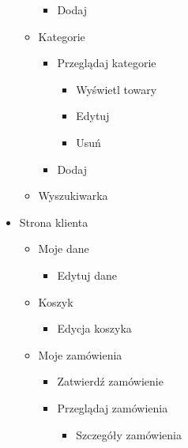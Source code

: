 \documentclass[10pt,a4paper]{article}
\begin{document}
\begin{itemize}
\begin{itemize}
\begin{itemize}
\begin{itemize}
		         \end{itemize}
		         \item Dodaj
		       \end{itemize}
		       \item Kategorie
		       \begin{itemize}
		         \item Przeglądaj kategorie
		         \begin{itemize}
		         \item Wyświetl towary
				 \item Edytuj
				 \item Usuń
		         \end{itemize}
		         \item Dodaj
		       \end{itemize}
		       \item Wyszukiwarka
		       \end{itemize}
		       \item Strona klienta
		       \begin{itemize}
		         \item Moje dane
		         \begin{itemize}
		         \item Edytuj dane
		         \end{itemize}
		         \item Koszyk
		         \begin{itemize}
		         \item Edycja koszyka
		         \end{itemize}
		         \item Moje zamówienia
		         \begin{itemize}
		         \item Zatwierdź zamówienie
		         \item Przeglądaj zamówienia
		         \begin{itemize}
		         \item Szczegóły zamówienia
		         \end{itemize}
		         \end{itemize}
		         

\end{itemize}
\end{itemize}
\end{document}
